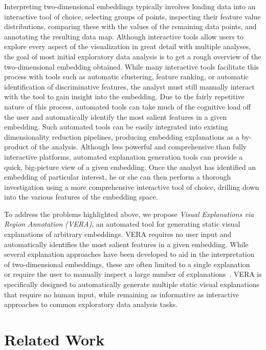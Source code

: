 \documentclass[lettersize,journal]{IEEEtran}
\begin{document}
Interpreting two-dimensional embeddings typically involves loading data into an interactive tool of choice, selecting groups of points, inspecting their feature value distributions, comparing these with the values of the remaining data points, and annotating the resulting data map.
Although interactive tools allow users to explore every aspect of the visualization in great detail with multiple analyses, the goal of most initial exploratory data analysis is to get a rough overview of the two-dimensional embedding obtained.
While many interactive tools facilitate this process with tools such as automatic clustering, feature ranking, or automatic identification of discriminative features, the analyst must still manually interact with the tool to gain insight into the embedding.
Due to the fairly repetitive nature of this process, automated tools can take much of the cognitive load off the user and automatically identify the most salient features in a given embedding.
Such automated tools can be easily integrated into existing dimensionality reduction pipelines, producing embedding explanations as a by-product of the analysis.
Although less powerful and comprehensive than fully interactive platforms, automated explanation generation tools can provide a quick, big-picture view of a given embedding. Once the analyst has identified an embedding of particular interest, he or she can then perform a thorough investigation using a more comprehensive interactive tool of choice, drilling down into the various features of the embedding space.

To address the problems highlighted above, we propose \textit{Visual Explanations via Region Annotation (VERA)}, an automated tool for generating static visual explanations of arbitrary embeddings. VERA requires no user input and automatically identifies the most salient features in a given embedding. While several explanation approaches have been developed to aid in the interpretation of two-dimensional embeddings, these are often limited to a single explanation~\cite{DaSilva2015,VanDriel2020,Tian2021} or require the user to manually inspect a large number of explanations~\cite{Faust2019,Plumb2020}.
VERA is specifically designed to automatically generate multiple static visual explanations that require no human input, while remaining as informative as interactive approaches to common exploratory data analysis tasks.

\section{Related Work}
\label{sec:related_work}
\end{document}

